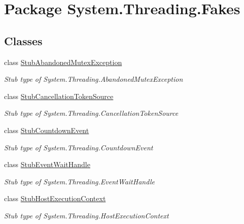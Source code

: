 \hypertarget{namespace_system_1_1_threading_1_1_fakes}{\section{Package System.\-Threading.\-Fakes}
\label{namespace_system_1_1_threading_1_1_fakes}
}
\subsection*{Classes}
\begin{DoxyCompactItemize}
\item 
class \hyperlink{class_system_1_1_threading_1_1_fakes_1_1_stub_abandoned_mutex_exception}{Stub\-Abandoned\-Mutex\-Exception}
\begin{DoxyCompactList}\small\item\em Stub type of System.\-Threading.\-Abandoned\-Mutex\-Exception\end{DoxyCompactList}\item 
class \hyperlink{class_system_1_1_threading_1_1_fakes_1_1_stub_cancellation_token_source}{Stub\-Cancellation\-Token\-Source}
\begin{DoxyCompactList}\small\item\em Stub type of System.\-Threading.\-Cancellation\-Token\-Source\end{DoxyCompactList}\item 
class \hyperlink{class_system_1_1_threading_1_1_fakes_1_1_stub_countdown_event}{Stub\-Countdown\-Event}
\begin{DoxyCompactList}\small\item\em Stub type of System.\-Threading.\-Countdown\-Event\end{DoxyCompactList}\item 
class \hyperlink{class_system_1_1_threading_1_1_fakes_1_1_stub_event_wait_handle}{Stub\-Event\-Wait\-Handle}
\begin{DoxyCompactList}\small\item\em Stub type of System.\-Threading.\-Event\-Wait\-Handle\end{DoxyCompactList}\item 
class \hyperlink{class_system_1_1_threading_1_1_fakes_1_1_stub_host_execution_context}{Stub\-Host\-Execution\-Context}
\begin{DoxyCompactList}\small\item\em Stub type of System.\-Threading.\-Host\-Execution\-Context\end{DoxyCompactList}\item 

\end{DoxyCompactItemize}
